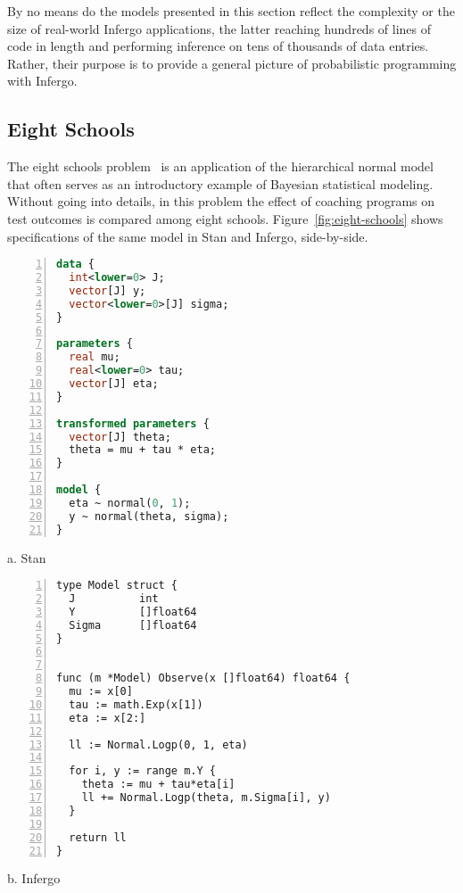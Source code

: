 \documentclass[sigplan,review,10pt,anonymous]{acmart}
\begin{document}
\begin{sloppypar}
By no means do the models presented in this section reflect the
complexity or the size of real-world Infergo applications, the
latter reaching hundreds of lines of code in length and
performing inference on tens of thousands of data entries.
Rather, their purpose is to provide a general picture of
probabilistic programming with Infergo.

\subsection{Eight Schools}
\label{sec:eight-schools}

The eight schools problem~\cite{GCS+03} is an application of
the hierarchical normal model that often serves as an introductory
example of Bayesian statistical modeling. Without going into
details, in this problem the effect of coaching programs on test
outcomes is compared among eight schools.
Figure~\ref{fig:eight-schools} shows specifications of the same
model in Stan and Infergo, side-by-side.
\begin{figure*}
  \begin{minipage}{0.45\textwidth}
  \begin{lstlisting}[language=Stan,framexleftmargin=10pt,numbers=left]
data {
  int<lower=0> J;
  vector[J] y;
  vector<lower=0>[J] sigma;
}

parameters {
  real mu;
  real<lower=0> tau;
  vector[J] eta;
}

transformed parameters {
  vector[J] theta;
  theta = mu + tau * eta;
}

model {
  eta ~ normal(0, 1);
  y ~ normal(theta, sigma);
}
\end{lstlisting}

\centering
a. Stan
  \end{minipage}
  \hfill
  \begin{minipage}{0.45\textwidth}
\begin{lstlisting}[framexleftmargin=10pt,numbers=left]
type Model struct {
  J          int
  Y          []float64
  Sigma      []float64
}


func (m *Model) Observe(x []float64) float64 {
  mu := x[0]
  tau := math.Exp(x[1])
  eta := x[2:]

  ll := Normal.Logp(0, 1, eta)

  for i, y := range m.Y {
    theta := mu + tau*eta[i]
    ll += Normal.Logp(theta, m.Sigma[i], y)
  }

  return ll
}
\end{lstlisting}
\centering
b. Infergo
  \end{minipage}
  \caption{Eight schools: Stan vs. Infergo. The Go implementation
  has a similar length and structure to the Stan model.}
  \label{fig:eight-schools}
\end{figure*}


\end{sloppypar}
\end{document}

